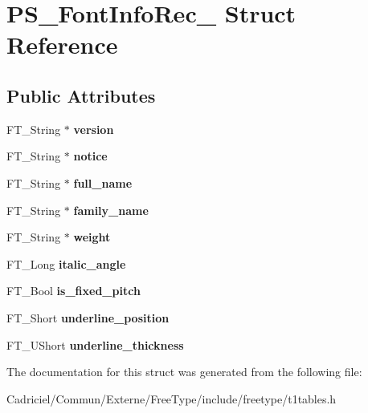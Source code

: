 \hypertarget{struct_p_s___font_info_rec__}{}\section{P\+S\+\_\+\+Font\+Info\+Rec\+\_\+ Struct Reference}
\label{struct_p_s___font_info_rec__}
\subsection*{Public Attributes}
\begin{DoxyCompactItemize}
\item 
F\+T\+\_\+\+String $\ast$ {\bfseries version}\hypertarget{struct_p_s___font_info_rec___adb595076e50f8e7ece9446f612433cfc}{}\label{struct_p_s___font_info_rec___adb595076e50f8e7ece9446f612433cfc}

\item 
F\+T\+\_\+\+String $\ast$ {\bfseries notice}\hypertarget{struct_p_s___font_info_rec___a63858ebce653f21d9aa2ddc61ee32b80}{}\label{struct_p_s___font_info_rec___a63858ebce653f21d9aa2ddc61ee32b80}

\item 
F\+T\+\_\+\+String $\ast$ {\bfseries full\+\_\+name}\hypertarget{struct_p_s___font_info_rec___a039dbf76ccc1b63b03e77215cb4b430b}{}\label{struct_p_s___font_info_rec___a039dbf76ccc1b63b03e77215cb4b430b}

\item 
F\+T\+\_\+\+String $\ast$ {\bfseries family\+\_\+name}\hypertarget{struct_p_s___font_info_rec___ac54d883f153a495f9a20dc043ed434cf}{}\label{struct_p_s___font_info_rec___ac54d883f153a495f9a20dc043ed434cf}

\item 
F\+T\+\_\+\+String $\ast$ {\bfseries weight}\hypertarget{struct_p_s___font_info_rec___a057243ec7cf62f573fa675ccb728f4b1}{}\label{struct_p_s___font_info_rec___a057243ec7cf62f573fa675ccb728f4b1}

\item 
F\+T\+\_\+\+Long {\bfseries italic\+\_\+angle}\hypertarget{struct_p_s___font_info_rec___ab558a75a56fadd54dfc71dcbeec1375a}{}\label{struct_p_s___font_info_rec___ab558a75a56fadd54dfc71dcbeec1375a}

\item 
F\+T\+\_\+\+Bool {\bfseries is\+\_\+fixed\+\_\+pitch}\hypertarget{struct_p_s___font_info_rec___a68e2d0913fe910ea86d558a4a426412a}{}\label{struct_p_s___font_info_rec___a68e2d0913fe910ea86d558a4a426412a}

\item 
F\+T\+\_\+\+Short {\bfseries underline\+\_\+position}\hypertarget{struct_p_s___font_info_rec___a772af52d17288d7846e8893e74d55212}{}\label{struct_p_s___font_info_rec___a772af52d17288d7846e8893e74d55212}

\item 
F\+T\+\_\+\+U\+Short {\bfseries underline\+\_\+thickness}\hypertarget{struct_p_s___font_info_rec___a423904e811db5195485557bf0dccf126}{}\label{struct_p_s___font_info_rec___a423904e811db5195485557bf0dccf126}

\end{DoxyCompactItemize}


The documentation for this struct was generated from the following file\+:\begin{DoxyCompactItemize}
\item 
Cadriciel/\+Commun/\+Externe/\+Free\+Type/include/freetype/t1tables.\+h\end{DoxyCompactItemize}
